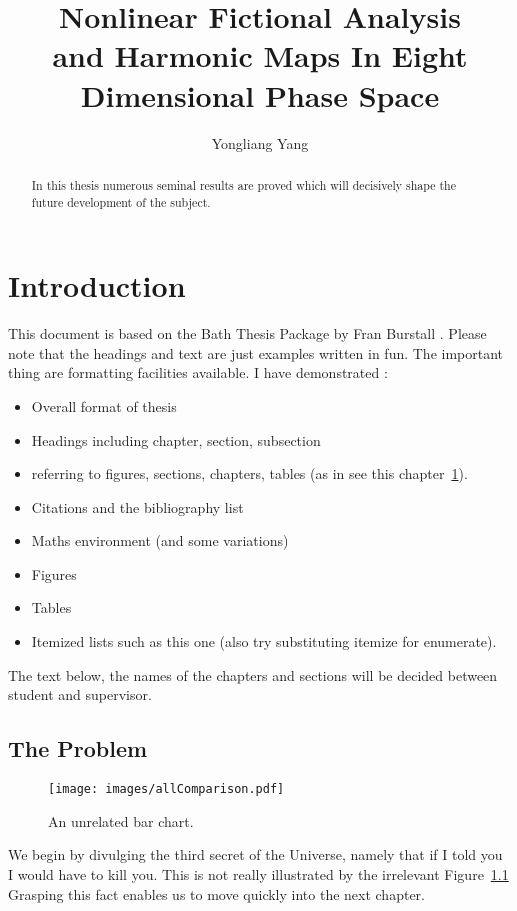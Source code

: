 \documentclass[11pt]{report}
\title{ Nonlinear Fictional Analysis\\and Harmonic Maps In Eight Dimensional Phase Space} \author{Yongliang Yang}
\begin{document}
\maketitle
\begin{abstract}
In this thesis numerous seminal results are proved which will decisively shape the future development of the subject. \end{abstract}


\chapter{Introduction}
\label{ch:intro}
This document is based on the Bath Thesis Package by Fran Burstall \cite{Burstall}.
Please note that the headings and text are just examples written in fun.  The important thing are formatting facilities available. I have demonstrated :
\begin{itemize}
\item Overall format of thesis
\item Headings including chapter, section, subsection
\item referring to figures, sections, chapters, tables (as in see this chapter~\ref{ch:intro}).
\item Citations and the bibliography list
\item Maths environment (and some variations)
\item Figures
\item Tables
\item Itemized lists such as this one (also try substituting itemize for enumerate).
\end{itemize}

The text below, the names of the chapters and sections will be decided between student and supervisor.


\section{The Problem}
\label{sec:problem}
\begin{figure}[htb]
  \centering
    \texttt{[image: images/allComparison.pdf]}
  \caption{\label{fig:all}
           An unrelated bar chart.}
\end{figure}

We begin by divulging the third secret of the Universe, namely that if I told you I would have to kill you.
This is not really illustrated by the irrelevant Figure~\ref{fig:all}
Grasping this fact enables us to move quickly into the next chapter.
\end{document}
